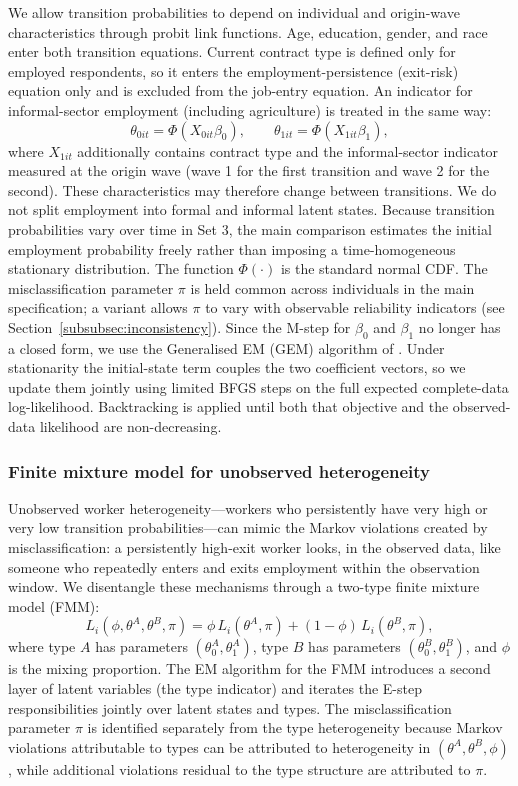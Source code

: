 We allow transition probabilities to depend on individual and origin-wave characteristics
through probit link functions. Age, education, gender, and race enter both
transition equations. Current contract type is defined only for employed
respondents, so it enters the employment-persistence (exit-risk) equation only
and is excluded from the job-entry equation. An indicator for informal-sector
employment (including agriculture) is treated in the same way:
\[
  \theta_{0it} = \Phi(X_{0it} \beta_0), \qquad
  \theta_{1it} = \Phi(X_{1it} \beta_1),
\]
where $X_{1it}$ additionally contains contract type and the informal-sector
indicator measured at the origin wave (wave 1 for the first transition and
wave 2 for the second). These characteristics may therefore change between
transitions. We do not split employment into formal and informal latent states.
Because transition probabilities vary over time in Set 3, the main comparison
estimates the initial employment probability freely rather than imposing a
time-homogeneous stationary distribution. The function $\Phi(\cdot)$ is the
standard normal CDF. The misclassification parameter
$\pi$ is held common across individuals in the main specification; a variant
allows $\pi$ to vary with observable reliability indicators (see
Section~\ref{subsubsec:inconsistency}). Since the M-step for $\beta_0$ and
$\beta_1$ no longer has a closed form, we use the Generalised EM (GEM)
algorithm of \citet{dempster1977}. Under stationarity the initial-state term
couples the two coefficient vectors, so we update them jointly using limited
BFGS steps on the full expected complete-data log-likelihood. Backtracking is
applied until both that objective and the observed-data likelihood are
non-decreasing.

\subsubsection{Finite mixture model for unobserved heterogeneity}\label{subsubsec:fmm}

Unobserved worker heterogeneity---workers who persistently have very high or
very low transition probabilities---can mimic the Markov violations created by
misclassification: a persistently high-exit worker looks, in the observed data,
like someone who repeatedly enters and exits employment within the observation
window. We disentangle these mechanisms through a two-type finite mixture model
(FMM):
\[
  L_i(\phi, \theta^A, \theta^B, \pi) =
  \phi\, L_i(\theta^A, \pi) + (1-\phi)\, L_i(\theta^B, \pi),
\]
where type $A$ has parameters $(\theta_0^A, \theta_1^A)$, type $B$ has
parameters $(\theta_0^B, \theta_1^B)$, and $\phi$ is the mixing proportion.
The EM algorithm for the FMM introduces a second layer of latent variables
(the type indicator) and iterates the E-step responsibilities jointly over
latent states and types. The misclassification parameter $\pi$ is identified
separately from the type heterogeneity because Markov violations attributable
to types can be attributed to heterogeneity in $(\theta^A, \theta^B, \phi)$, while
additional violations residual to the type structure are attributed to $\pi$.

